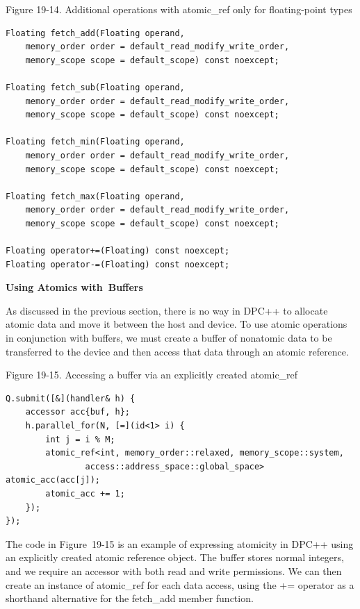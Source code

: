 \hspace*{\fill} \par %
Figure 19-14. Additional operations with atomic\_ref only for floating-point types
\begin{lstlisting}[caption={}]
Floating fetch_add(Floating operand,
	memory_order order = default_read_modify_write_order,
	memory_scope scope = default_scope) const noexcept;
	
Floating fetch_sub(Floating operand,
	memory_order order = default_read_modify_write_order,
	memory_scope scope = default_scope) const noexcept;
	
Floating fetch_min(Floating operand,
	memory_order order = default_read_modify_write_order,
	memory_scope scope = default_scope) const noexcept;
	
Floating fetch_max(Floating operand,
	memory_order order = default_read_modify_write_order,
	memory_scope scope = default_scope) const noexcept;
	
Floating operator+=(Floating) const noexcept;
Floating operator-=(Floating) const noexcept;
\end{lstlisting}

\hspace*{\fill} \par %
\textbf{Using Atomics with Buffers}

As discussed in the previous section, there is no way in DPC++ to allocate atomic data and move it between the host and device. To use atomic operations in conjunction with buffers, we must create a buffer of nonatomic data to be transferred to the device and then access that data through an atomic reference.\par

\hspace*{\fill} \par %
Figure 19-15. Accessing a buffer via an explicitly created atomic\_ref
\begin{lstlisting}[caption={}]
Q.submit([&](handler& h) {
	accessor acc{buf, h};
	h.parallel_for(N, [=](id<1> i) {
		int j = i % M;
		atomic_ref<int, memory_order::relaxed, memory_scope::system,
				access::address_space::global_space> atomic_acc(acc[j]);
		atomic_acc += 1;
	});
});
\end{lstlisting}

The code in Figure 19-15 is an example of expressing atomicity in DPC++ using an explicitly created atomic reference object. The buffer stores normal integers, and we require an accessor with both read and write permissions. We can then create an instance of atomic\_ref for each data access, using the += operator as a shorthand alternative for the fetch\_add member function.\par

